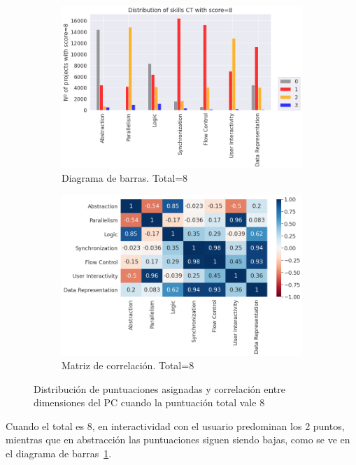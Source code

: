 \documentclass[a4paper, 12pt]{book}
\begin{document}
\begin{figure}[H]
    \centering
    \begin{subfigure}[h]{.49\textwidth} 
        \includegraphics[width=\textwidth]{img/distribucion_8_Scratch}
        \caption{Diagrama de barras. Total=8}
        \label{fig:total8}
    \end{subfigure}       
    \begin{subfigure}[h]{.49\textwidth} 
        \includegraphics[width=\textwidth]{img/corr_8_Scratch}
        \caption{Matriz de correlación. Total=8}
        \label{fig:corr8}
    \end{subfigure}
     \caption{Distribución de puntuaciones asignadas y correlación entre dimensiones del PC cuando la puntuación total vale 8}
\end{figure}

Cuando el total es 8, en interactividad con el usuario predominan los 2 puntos, mientras que en abstracción las puntuaciones siguen siendo bajas, como se ve en el diagrama de barras~\ref{fig:total8}.
\end{document}
